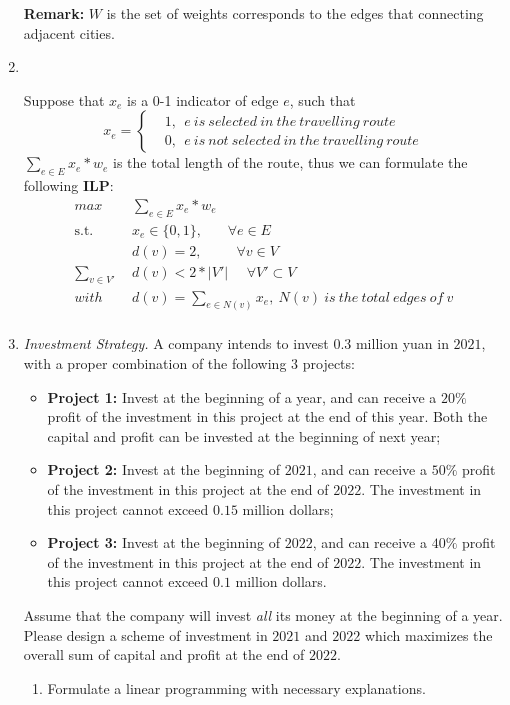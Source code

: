 \documentclass[12pt,a4paper]{article}
\makeatletter
\newtheorem*{solution}{Solution}
\theoremstyle{definition}
\renewenvironment{solution}[1][Solution] {\par\pushQED{\qed}\normalfont\topsep6\p@\@plus6\p@\relax\trivlist\item[\hskip\labelsep\bfseries#1\@addpunct{.}]\ignorespaces}{\popQED\endtrivlist\@endpefalse} \makeatother
\makeatother
\begin{document}
\begin{enumerate}
    \textbf{Remark:} $ W $ is the set of weights corresponds to the edges that connecting adjacent cities. \begin{solution}
    ~\par Suppose that $x_e$ is a 0-1 indicator of edge $e$, such that 
    \begin{equation}
        x_e=\left\{
    \begin{aligned}
    &1,~~e~is~selected~in~the~travelling~route \\
    &0,~~e~is~not~selected~in~the~travelling~route
    \end{aligned}
    \right.
    \end{equation}
    $\sum_{e\in E}x_e*w_e$ is the total length of the route, thus we can formulate the following \textbf{ILP}:\\
    \begin{equation}
    \begin{aligned}
        max~~~~~~&\sum_{e\in E}x_e*w_e\\
        \operatorname{s.t.}~~~~~~&x_e\in \{0,1\},~~~~~~~~\forall e\in E\\
        &d(v)=2, ~~~~~~~~~~~\forall v\in V\\
        \sum_{v\in V'}&d(v)<2*|V'|~~~~~~\forall V' \subset V\\
        with~~~~&d(v)=\sum_{e\in N(v)} x_e,~N(v)~is~the~total~edges~of~v\\
        \end{aligned}
    \end{equation}
    
    \end{solution}
    \item
    \textit{Investment Strategy.} A company intends to invest $0.3$ million yuan in $2021$, with a proper combination of the following $3$ projects:
    \begin{itemize}
    \item \textbf{Project 1:} Invest at the beginning of a year, and can receive a $20\%$ profit of the investment in this project at the end of this year. Both the capital and profit can be invested at the beginning of next year;
    \item \textbf{Project 2:} Invest at the beginning of $2021$, and can receive a $50\%$ profit of the investment in this project at the end of $2022$. The investment in this project cannot exceed $0.15$ million dollars;
    \item \textbf{Project 3:} Invest at the beginning of $2022$, and can receive a $40\%$ profit of the investment in this project at the end of $2022$. The investment in this project cannot exceed $0.1$ million dollars.
    \end{itemize}
    Assume that the company will invest \emph{all} its money at the beginning of a year. Please design a scheme of investment in $2021$ and $2022$ which maximizes the overall sum of capital and profit at the end of $2022$.
    \begin{enumerate}
    \item
    Formulate a linear programming with necessary explanations.


\end{enumerate}
\end{enumerate}
\end{document}
